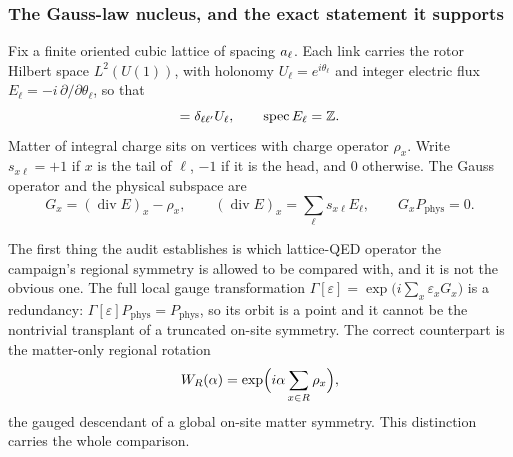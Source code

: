 \subsubsection*{The Gauss-law nucleus, and the exact statement it supports}

Fix a finite oriented cubic lattice of spacing $a_{\ell}$. Each link carries
the rotor Hilbert space $L^2(U(1))$, with holonomy $U_\ell=e^{i\theta_\ell}$ and
integer electric flux $E_\ell=-i\,\partial/\partial\theta_\ell$, so that
\begin{equation}
  [E_\ell,U_{\ell'}]=\delta_{\ell\ell'}U_\ell,
  \qquad
  \spec E_\ell=\Z .
  \label{eq:da-rotor}
\end{equation}
Matter of integral charge sits on vertices with charge operator $\rho_x$. Write
$s_{x\ell}=+1$ if $x$ is the tail of $\ell$, $-1$ if it is the head, and $0$
otherwise. The Gauss operator and the physical subspace are
\begin{equation}
  G_x=(\operatorname{div}E)_x-\rho_x,
  \qquad
  (\operatorname{div}E)_x=\sum_\ell s_{x\ell}E_\ell,
  \qquad
  G_xP_{\mathrm{phys}}=0 .
  \label{eq:da-gauss}
\end{equation}

The first thing the audit establishes is which lattice-QED operator the
campaign's regional symmetry is allowed to be compared with, and it is not the
obvious one. The full local gauge transformation
$\Gamma[\varepsilon]=\exp\bigl(i\sum_x\varepsilon_xG_x\bigr)$ is a redundancy:
$\Gamma[\varepsilon]P_{\mathrm{phys}}=P_{\mathrm{phys}}$, so its orbit is a
point and it cannot be the nontrivial transplant of a truncated on-site
symmetry. The correct counterpart is the matter-only regional rotation
\begin{equation}
  W_R(\alpha)=\exp\Bigl(i\alpha\sum_{x\in R}\rho_x\Bigr),
  \label{eq:da-Wr}
\end{equation}
the gauged descendant of a global on-site matter symmetry. This distinction
carries the whole comparison.

